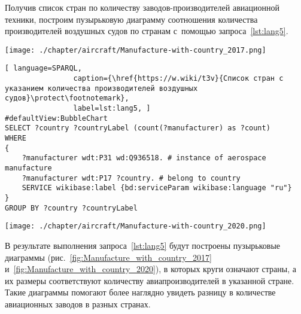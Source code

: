 
Получив список стран по количеству заводов-производителей авиационной техники, 
построим пузырьковую диаграмму 
соотношения количества производителей воздушных судов по странам 
с~помощью запроса~\ref{lst:lang5}.

\begin{marginfigure}[0\baselineskip]
\centering
	\texttt{[image: ./chapter/aircraft/Manufacture-with-country\_2017.png]}
	\caption{Соотношение количества производителей воздушных судов по странам, 2017 год}
	\label{fig:Manufacture_with_country_2017}
\end{marginfigure}


\begin{lstlisting}[ language=SPARQL, 
                caption={\href{https://w.wiki/t3v}{Список стран с указанием количества производителей воздушных судов}\protect\footnotemark}, 
                label=lst:lang5, ]
#defaultView:BubbleChart
SELECT ?country ?countryLabel (count(?manufacturer) as ?count)
WHERE
{
    ?manufacturer wdt:P31 wd:Q936518. # instance of aerospace manufacture
  	?manufacturer wdt:P17 ?country. # belong to country
    SERVICE wikibase:label {bd:serviceParam wikibase:language "ru"}
}
GROUP BY ?country ?countryLabel
\end{lstlisting}

\begin{marginfigure}
\centering
	\texttt{[image: ./chapter/aircraft/Manufacture-with-country\_2020.png]}
	\caption{Соотношение количества производителей воздушных судов по странам, 2020 год}
	\label{fig:Manufacture_with_country_2020}
\end{marginfigure}

В результате выполнения запроса~\ref{lst:lang5} будут построены пузырьковые диаграммы 
(рис.~\ref{fig:Manufacture_with_country_2017} и~\ref{fig:Manufacture_with_country_2020}), 
в которых круги означают страны, 
а их размеры соответствуют количеству авиапроизводителей в указанной стране. 
Такие диаграммы помогают более наглядно увидеть разницу в количестве авиационных заводов в разных странах.


